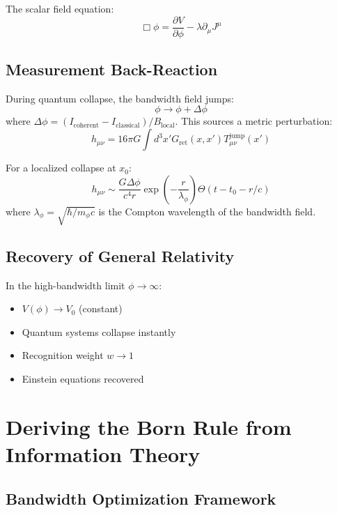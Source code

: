 \documentclass[twocolumn,prd,amsmath,amssymb,aps,superscriptaddress,nofootinbib]{revtex4-2}
\begin{document}
The scalar field equation:
\begin{equation}
\Box\phi = \frac{\partial V}{\partial\phi} - \lambda \partial_\mu J^\mu
\label{eq:scalar_field}
\end{equation}

\subsection{Measurement Back-Reaction}

During quantum collapse, the bandwidth field jumps:
\begin{equation}
\phi \rightarrow \phi + \Delta\phi
\end{equation}
where $\Delta\phi = (I_{\text{coherent}} - I_{\text{classical}})/B_{\text{local}}$. This sources a metric perturbation:
\begin{equation}
h_{\mu\nu} = 16\pi G \int d^3x' G_{\text{ret}}(x,x') T_{\mu\nu}^{\text{jump}}(x')
\end{equation}

For a localized collapse at $x_0$:
\begin{equation}
h_{\mu\nu} \sim \frac{G\Delta\phi}{c^4 r} \exp\left(-\frac{r}{\lambda_\phi}\right) \Theta(t - t_0 - r/c)
\label{eq:metric_perturbation}
\end{equation}
where $\lambda_\phi = \sqrt{\hbar/m_\phi c}$ is the Compton wavelength of the bandwidth field.

\subsection{Recovery of General Relativity}

In the high-bandwidth limit $\phi \rightarrow \infty$:
\begin{itemize}
\item $V(\phi) \rightarrow V_0$ (constant)
\item Quantum systems collapse instantly
\item Recognition weight $w \rightarrow 1$
\item Einstein equations recovered
\end{itemize}

\section{Deriving the Born Rule from Information Theory}
\label{sec:born}

\subsection{Bandwidth Optimization Framework}
\end{document}

